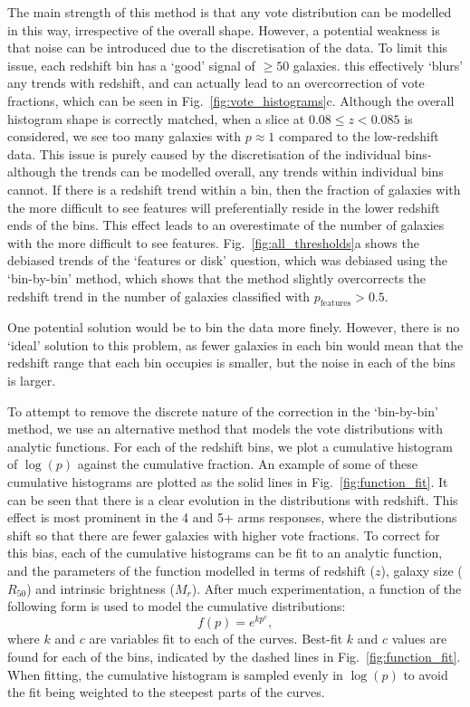\documentclass[useAMS,usenatbib]{mn2e}
\begin{document}
The main strength of this method is that any vote distribution can be modelled in this way, irrespective of the overall shape. However, a potential weakness is that noise can be introduced due to the discretisation of the data. To limit this issue, each redshift bin has a `good' signal of $\geq50$ galaxies. this effectively `blurs' any trends with redshift, and can actually lead to an overcorrection of vote fractions, which can be seen in Fig.~\ref{fig:vote_histograms}c. Although the overall histogram shape is correctly matched, when a slice at $0.08 \leq z < 0.085$ is considered, we see too many galaxies with $p \approx 1$ compared to the low-redshift data. This issue is purely caused by the discretisation of the individual bins- although the trends can be modelled overall, any trends within individual bins cannot. If there is a redshift trend within a bin, then the fraction of galaxies with the more difficult to see features will preferentially reside in the lower redshift ends of the bins. This effect leads to an overestimate of the number of galaxies with the more difficult to see features. Fig.~\ref{fig:all_thresholds}a shows the debiased trends of the `features or disk' question, which was debiased using the `bin-by-bin' method, which shows that the method slightly overcorrects the redshift trend in the number of galaxies classified with $p_{\mathrm{features}} > 0.5.$

One potential solution would be to bin the data more finely. However, there is no `ideal' solution to this problem, as fewer galaxies in each bin would mean that the redshift range that each bin occupies is smaller, but the noise in each of the bins is larger. 

To attempt to remove the discrete nature of the correction in the `bin-by-bin' method, we use an alternative method that models the vote distributions with analytic functions. For each of the redshift bins, we plot a cumulative histogram of $\log(p)$ against the cumulative fraction. An example of some of these cumulative histograms are plotted as the solid lines in Fig.~\ref{fig:function_fit}. It can be seen that there is a clear evolution in the distributions with redshift. This effect is most prominent in the 4 and 5+ arms responses, where the distributions shift so that there are fewer galaxies with higher vote fractions. To correct for this bias, each of the cumulative histograms can be fit to an analytic function, and the parameters of the function modelled in terms of redshift ($z$), galaxy size ($R_{50}$) and intrinsic brightness ($M_r$). After much experimentation, a function of the following form is used to model the cumulative distributions:
\begin{equation}
f(p) = e^{kp^{c}}\mathrm{,}
\end{equation}
where $k$ and $c$ are variables fit to each of the curves. Best-fit $k$ and $c$ values are found for each of the bins, indicated by the dashed lines in Fig.~\ref{fig:function_fit}. When fitting, the cumulative histogram is sampled evenly in $\log(p)$ to avoid the fit being weighted to the steepest parts of the curves. 
\end{document}
